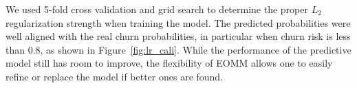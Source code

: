 
We used 5-fold cross validation and grid search to determine the proper $L_2$ regularization strength when training the model. The predicted probabilities were well aligned with the real churn probabilities, in particular when churn risk is less than 0.8, as shown in Figure~\ref{fig:lr_cali}. While the performance of the predictive model still has room to improve, the flexibility of EOMM allows one to easily refine or replace the model if better ones are found.




%


